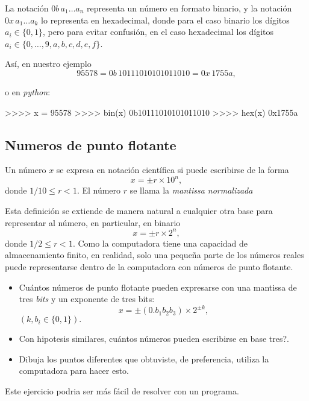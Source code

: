 \begin{definition}
  La notación $0b\,a_1\ldots a_n$ representa un número en formato binario, y la notación $0x\,a_1\ldots a_k$ lo representa en hexadecimal, donde para el caso binario los dígitos $a_i \in \{0, 1\}$, pero para evitar confusión, en el caso hexadecimal los dígitos $a_i \in \{0,  \ldots, 9, a, b, c, d, e, f\}$.
\end{definition}

Así, en nuestro ejemplo
\[95578 = 0b\,10111010101011010 = 0x\,1755a,\]

o en \emph{python}:

\begin{pyconcode}
  >>>> x = 95578
  >>>> bin(x)
  0b10111010101011010
  >>>> hex(x)
  0x1755a
\end{pyconcode}

\subsection{Numeros de punto flotante}
\begin{definition}
  Un número $x$ se expresa en notación científica si puede escribirse de la forma 
\[x = \pm r \times 10^n,\]
donde $1/10 \leq r < 1$. El número $r$ se llama la \emph{mantissa normalizada}
\end{definition}

Esta definición se extiende de manera natural a cualquier otra base para representar al número, en particular, en binario
\[x = \pm r \times 2^n,\]
donde $1/2 \leq r < 1$. Como la computadora tiene una capacidad de almacenamiento finito, en realidad, solo una pequeña parte de los números reales puede representarse dentro de la computadora con números de punto flotante.

\begin{exercise}
  \begin{itemize}
  \item Cuántos números de punto flotante pueden expresarse con una mantissa de tres \emph{bits} y un exponente de tres bits:
\[x = \pm(0.b_1b_2b_3) \times 2^{\pm k},\]
$(k, b_i \in \{0, 1\}).$
\item Con hipotesis similares, cuántos números pueden escribirse en base tres?.
\item Dibuja los puntos diferentes que obtuviste, de preferencia, utiliza la computadora para hacer esto.
\end{itemize}
Este ejercicio podria ser más fácil de resolver con un programa.
\end{exercise}

